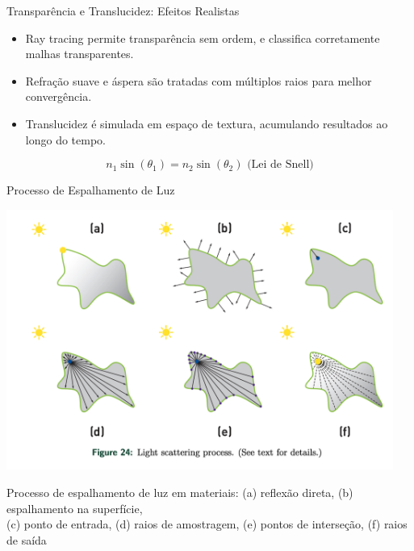 \documentclass[aspectratio=169,xcolor=table]{beamer}
\begin{document}
\begin{frame}{Transparência e Translucidez: Efeitos Realistas}
    \begin{itemize}
        \item Ray tracing permite transparência sem ordem, e classifica corretamente malhas transparentes.
        \item Refração suave e áspera são tratadas com múltiplos raios para melhor convergência.
        \item Translucidez é simulada em espaço de textura, acumulando resultados ao longo do tempo.
    \end{itemize}
    \begin{equation*}
        n_1 \sin(\theta_1) = n_2 \sin(\theta_2) \text{ (Lei de Snell)}
    \end{equation*}
\end{frame}

\begin{frame}{Processo de Espalhamento de Luz}
    \begin{center}
        \includegraphics[width=0.95\textwidth]{light-scattering-process}
    \end{center}
    \begin{center}
        \small{Processo de espalhamento de luz em materiais: (a) reflexão direta, (b) espalhamento na superfície,\\
        (c) ponto de entrada, (d) raios de amostragem, (e) pontos de interseção, (f) raios de saída}
    \end{center}
\end{frame}
\end{document}
